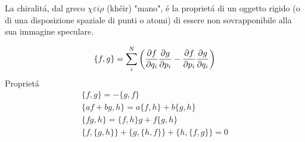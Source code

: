 \begin{multicols}{3}
  La chiralit\'a, dal greco $\chi\varepsilon i\rho$ (kh\'eir) "mano", \'e la
  propriet\'a di un oggetto rigido (o di una disposizione spaziale di punti o
  atomi) di essere non sovrapponibile alla sua immagine speculare.

  \begin{equation}
    \label{eq:poisson-brackets}
    \{f, g\} = \sum_i^N \left(
      \pdv{f}{q_i}\pdv{g}{p_i} - \pdv{f}{p_i}\pdv{g}{q_i}
    \right)
  \end{equation}
  Propriet\'a
  \begin{equation}
    \label{th:poisson-brackets}
    \begin{gathered}
      \{f, g\} = -\{g, f\} \\
      \{af + bg, h\} = a\{f, h\} + b\{g, h\} \\
      \{fg, h\} = \{f, h\}g + f\{g, h\} \\
      \{f, \{g, h\}\} + \{g, \{h, f\}\} + \{h, \{f, g\}\} = 0
    \end{gathered}
  \end{equation}
  

\end{multicols}


